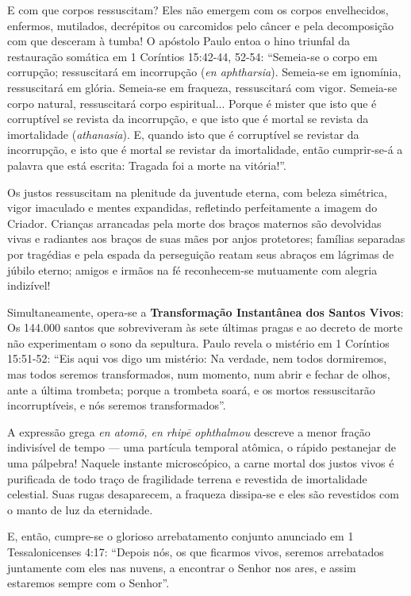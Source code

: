 E com que corpos ressuscitam?
Eles não emergem com os corpos envelhecidos, enfermos, mutilados, decrépitos ou carcomidos pelo câncer e pela decomposição com que desceram à tumba!
O apóstolo Paulo entoa o hino triunfal da restauração somática em 1 Coríntios 15:42-44, 52-54:
``Semeia-se o corpo em corrupção; ressuscitará em incorrupção (\textit{en aphtharsia}). Semeia-se em ignomínia, ressuscitará em glória. Semeia-se em fraqueza, ressuscitará com vigor. Semeia-se corpo natural, ressuscitará corpo espiritual... Porque é mister que isto que é corruptível se revista da incorrupção, e que isto que é mortal se revista da imortalidade (\textit{athanasia}). E, quando isto que é corruptível se revistar da incorrupção, e isto que é mortal se revistar da imortalidade, então cumprir-se-á a palavra que está escrita: Tragada foi a morte na vitória!''.

Os justos ressuscitam na plenitude da juventude eterna, com beleza simétrica, vigor imaculado e mentes expandidas, refletindo perfeitamente a imagem do Criador. Crianças arrancadas pela morte dos braços maternos são devolvidas vivas e radiantes aos braços de suas mães por anjos protetores; famílias separadas por tragédias e pela espada da perseguição reatam seus abraços em lágrimas de júbilo eterno; amigos e irmãos na fé reconhecem-se mutuamente com alegria indizível!

Simultaneamente, opera-se a \textbf{Transformação Instantânea dos Santos Vivos}:
Os 144.000 santos que sobreviveram às sete últimas pragas e ao decreto de morte não experimentam o sono da sepultura. Paulo revela o mistério em 1 Coríntios 15:51-52:
``Eis aqui vos digo um mistério: Na verdade, nem todos dormiremos, mas todos seremos transformados, num momento, num abrir e fechar de olhos, ante a última trombeta; porque a trombeta soará, e os mortos ressuscitarão incorruptíveis, e nós seremos transformados''.

A expressão grega \textit{en atomō, en rhipē ophthalmou} descreve a menor fração indivisível de tempo — uma partícula temporal atômica, o rápido pestanejar de uma pálpebra! Naquele instante microscópico, a carne mortal dos justos vivos é purificada de todo traço de fragilidade terrena e revestida de imortalidade celestial. Suas rugas desaparecem, a fraqueza dissipa-se e eles são revestidos com o manto de luz da eternidade.

E, então, cumpre-se o glorioso arrebatamento conjunto anunciado em 1 Tessalonicenses 4:17:
``Depois nós, os que ficarmos vivos, seremos arrebatados juntamente com eles nas nuvens, a encontrar o Senhor nos ares, e assim estaremos sempre com o Senhor''.

